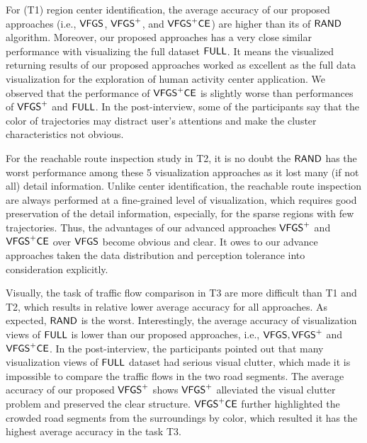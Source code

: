 For (T1) region center identification, the average accuracy of our proposed approaches (i.e., $\mathsf{VFGS}$, $\mathsf{VFGS}^{+}$, and $\mathsf{VFGS}^{+}\mathsf{CE}$) are higher than its of $\mathsf{RAND}{}$ algorithm.
Moreover, our proposed approaches has a very close similar performance with visualizing the full dataset $\mathsf{FULL}$.
It means the visualized returning results of our proposed approaches worked as excellent as the full data visualization for the exploration of human activity center application.
We observed that the performance of $\mathsf{VFGS}^{+}\mathsf{CE}$ is slightly worse than performances of $\mathsf{VFGS}^{+}$ and $\mathsf{FULL}$.
In the post-interview, some of the participants say that the color of trajectories may distract user's attentions and make the cluster characteristics not obvious.



For the reachable route inspection study in T2, it is no doubt the $\mathsf{RAND}$ has the worst performance among these 5 visualization approaches as it lost many (if not all) detail information.
Unlike center identification, the reachable route inspection are always performed at a fine-grained level of visualization,
which requires good preservation of the detail information, especially, for the sparse regions with few trajectories.
Thus, the advantages of our advanced approaches $\mathsf{VFGS}^{+}$ and $\mathsf{VFGS}^{+}\mathsf{CE}$ over $\mathsf{VFGS}$ become obvious and clear.
It owes to our advance approaches taken the data distribution and perception tolerance into consideration explicitly.



Visually, the task of traffic flow comparison in T3 are more difficult than T1 and T2, which results in relative lower average accuracy for all approaches.  As expected, $\mathsf{RAND}$ is the worst.
Interestingly, the average accuracy of visualization views of $\mathsf{FULL}$ is lower than our proposed approaches, i.e., $\mathsf{VFGS},\mathsf{VFGS}^{+}$ and $\mathsf{VFGS}^{+}\mathsf{CE}$.
In the post-interview, the participants pointed out that many visualization views of $\mathsf{FULL}$ dataset had serious visual clutter,
which made it is impossible to compare the traffic flows in the two road segments.
The average accuracy of our proposed $\mathsf{VFGS}^{+}$ shows $\mathsf{VFGS}^{+}$ alleviated the visual clutter problem and preserved the clear structure.
$\mathsf{VFGS}^{+}\mathsf{CE}$ further highlighted the crowded road segments from the surroundings by color, which resulted it has the highest average accuracy in the task T3.

